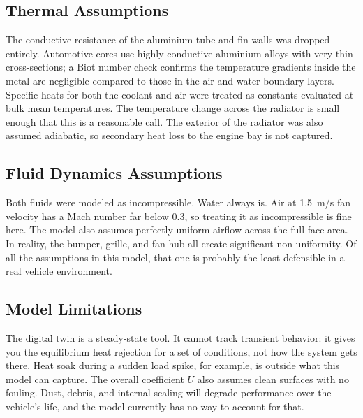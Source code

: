 \documentclass[12pt, a4paper]{article}
\begin{document}
\subsection{Thermal Assumptions}
The conductive resistance of the aluminium tube and fin walls was dropped entirely. Automotive cores use highly conductive aluminium alloys with very thin cross-sections; a Biot number check confirms the temperature gradients inside the metal are negligible compared to those in the air and water boundary layers. Specific heats for both the coolant and air were treated as constants evaluated at bulk mean temperatures. The temperature change across the radiator is small enough that this is a reasonable call. The exterior of the radiator was also assumed adiabatic, so secondary heat loss to the engine bay is not captured.

\subsection{Fluid Dynamics Assumptions}
Both fluids were modeled as incompressible. Water always is. Air at 1.5~m/s fan velocity has a Mach number far below 0.3, so treating it as incompressible is fine here. The model also assumes perfectly uniform airflow across the full face area. In reality, the bumper, grille, and fan hub all create significant non-uniformity. Of all the assumptions in this model, that one is probably the least defensible in a real vehicle environment.

\subsection{Model Limitations}
The digital twin is a steady-state tool. It cannot track transient behavior: it gives you the equilibrium heat rejection for a set of conditions, not how the system gets there. Heat soak during a sudden load spike, for example, is outside what this model can capture. The overall coefficient $U$ also assumes clean surfaces with no fouling. Dust, debris, and internal scaling will degrade performance over the vehicle's life, and the model currently has no way to account for that.
\end{document}
